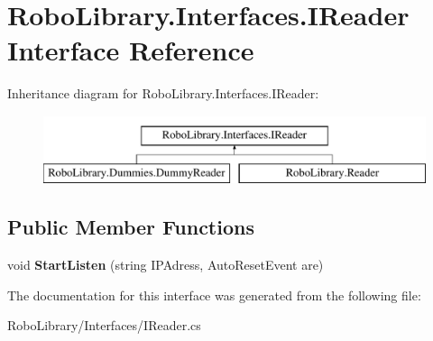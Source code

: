 \hypertarget{interface_robo_library_1_1_interfaces_1_1_i_reader}{}\section{Robo\+Library.\+Interfaces.\+I\+Reader Interface Reference}
\label{interface_robo_library_1_1_interfaces_1_1_i_reader}
Inheritance diagram for Robo\+Library.\+Interfaces.\+I\+Reader\+:\begin{figure}[H]
\begin{center}
\leavevmode
\includegraphics[height=2.000000cm]{interface_robo_library_1_1_interfaces_1_1_i_reader}
\end{center}
\end{figure}
\subsection*{Public Member Functions}
\begin{DoxyCompactItemize}
\item 
\hypertarget{interface_robo_library_1_1_interfaces_1_1_i_reader_a4ce833c4049ed58b8711d5ac55681203}{}\label{interface_robo_library_1_1_interfaces_1_1_i_reader_a4ce833c4049ed58b8711d5ac55681203} 
void {\bfseries Start\+Listen} (string I\+P\+Adress, Auto\+Reset\+Event are)
\end{DoxyCompactItemize}


The documentation for this interface was generated from the following file\+:\begin{DoxyCompactItemize}
\item 
Robo\+Library/\+Interfaces/I\+Reader.\+cs\end{DoxyCompactItemize}
